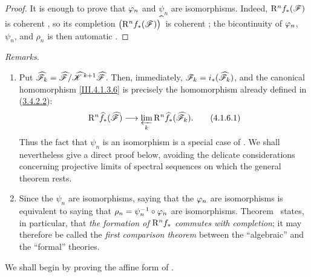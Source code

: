 \begin{proof}
It is enough to prove that $\varphi_n$ and $\psi_n$ are isomorphisms.
Indeed, $\mathrm{R}^n f_*(\mathscr{F})$ is coherent , so its
completion $\bigl(\mathrm{R}^n f_*(\mathscr{F})\bigr)^{\widehat{\,}}$ is coherent
; the bicontinuity of $\varphi_n$, $\psi_n$, and
$\rho_n$ is then automatic .
\end{proof}

\begin{env}[4.1.6]
\label{III.4.1.6}
\emph{Remarks.}
\begin{enumerate}
  \item[(i)] Put $\widehat{\mathscr{F}}_k
=
\widehat{\mathscr{F}}/
\widehat{\mathscr{K}}^{\,k+1}\widehat{\mathscr{F}}$.
  Then, immediately, $\mathscr{F}_k=i_*(\widehat{\mathscr{F}}_k)$,
  and the canonical homomorphism \eqref{III.4.1.3.6} is precisely the
  homomorphism already defined in (\hyperref[III.3.4.2.2]{3.4.2.2}):
  \[
    \mathrm{R}^n\widehat{f}_*(\widehat{\mathscr{F}})
    \longrightarrow
    \varprojlim_k
    \mathrm{R}^n\widehat{f}_*(\widehat{\mathscr{F}}_k).
    \tag{4.1.6.1}
    \label{III.4.1.6.1}
  \]
  Thus the fact that $\psi_n$ is an isomorphism is a special case of
  .
  We shall nevertheless give a direct proof below, avoiding the
  delicate considerations concerning projective limits of spectral
  sequences  on which the general theorem
   rests.

  \item[(ii)] Since the $\psi_n$ are isomorphisms, saying that the
  $\varphi_n$ are isomorphisms is equivalent to saying that $\rho_n=\psi_n^{-1}\circ\varphi_n$
  are isomorphisms.
  Theorem~ states, in particular, that \emph{the formation of}
  $\mathrm{R}^n f_*$ \emph{commutes with completion}; it may therefore be called the
  \emph{first comparison theorem} between the ``algebraic'' and the
  ``formal'' theories.
\end{enumerate}
We shall begin by proving the affine form of .
\end{env}

